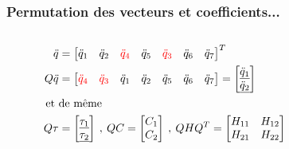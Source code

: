 \documentclass[10pt]{beamer}
\begin{document}
\begin{frame}
  
  \frametitle{Permutation des vecteurs et coefficients...}
  \hypertarget{ch_permutation}{}
  
  \begin{columns}[T]
    \begin{column}{.7\textwidth}\small
	  \begin{align*}
		\ddot{q} &= 
		\begin{bmatrix}
		  \ddot{q}_1 & \ddot{q}_2 & \textcolor{red}{\ddot{q}_4} & \ddot{q}_5 & \textcolor{red}{\ddot{q}_3} & \ddot{q}_6 & \ddot{q}_7
		\end{bmatrix}^T \\
		Q \ddot{q} &= 
		\begin{bmatrix}
		  \textcolor{red}{\ddot{q}_4} & \textcolor{red}{\ddot{q}_3} & \ddot{q}_1 & \ddot{q}_2 & \ddot{q}_5 & \ddot{q}_6 & \ddot{q}_7
		\end{bmatrix}
		=
		\begin{bmatrix}
		  \underline{\ddot{q}_1} \\
		  \underline{\ddot{q}_2}
		\end{bmatrix} \\
		\textnormal{ et } &\textnormal{de même } \\
		Q \tau &= 
		\begin{bmatrix}
		  \underline{\tau_1} \\
		  \underline{\tau_2}
		\end{bmatrix}
		\: , \:
		Q C = 
		\begin{bmatrix}
		  C_1 \\
		  C_2
		\end{bmatrix}
		\: , \: Q H Q^T = 
		\begin{bmatrix}
		  H_{11} & H_{12} \\
		  H_{21} & H_{22}
		\end{bmatrix} 
		\end{align*}
  \end{column}%
  \hfill%
  \begin{column}{.3\textwidth}
    \vspace{-.5cm} 
  \end{column}%
  \end{columns} \pause
	

\end{frame}
\end{document}
